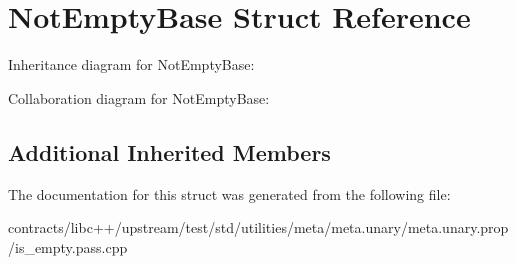 \hypertarget{struct_not_empty_base}{}\section{Not\+Empty\+Base Struct Reference}
\label{struct_not_empty_base}


Inheritance diagram for Not\+Empty\+Base\+:


Collaboration diagram for Not\+Empty\+Base\+:
\subsection*{Additional Inherited Members}


The documentation for this struct was generated from the following file\+:\begin{DoxyCompactItemize}
\item 
contracts/libc++/upstream/test/std/utilities/meta/meta.\+unary/meta.\+unary.\+prop/is\+\_\+empty.\+pass.\+cpp\end{DoxyCompactItemize}
